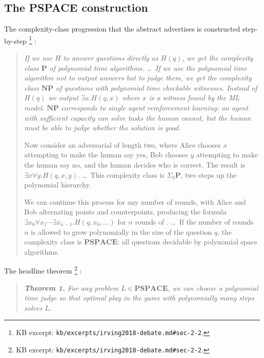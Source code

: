\subsection{The PSPACE construction}
\label{sec:oversight-pspace}

The complexity-class progression that the abstract advertises is
constructed step-by-step%
\footnote{KB excerpt: \nolinkurl{kb/excerpts/irving2018-debate.md#sec-2-2}.}
\citep[\S 2.2, p.~5]{irving2018-debate}:

\begin{quote}\itshape
If we use $H$ to answer questions directly as $H(q)$, we get the
complexity class $\mathbf{P}$ of polynomial time algorithms. \ldots\
If we use the polynomial time algorithm not to output answers but to
judge them, we get the complexity class $\mathbf{NP}$ of questions
with polynomial time checkable witnesses. Instead of $H(q)$ we output
$\exists x. H(q, x)$ where $x$ is a witness found by the ML model.
$\mathbf{NP}$ corresponds to single agent reinforcement learning: an
agent with sufficient capacity can solve tasks the human cannot, but
the human must be able to judge whether the solution is good.

Now consider an adversarial  of length two, where Alice chooses
$x$ attempting to make the human say yes, Bob chooses $y$ attempting
to make the human say no, and the human decides who is correct. The
result is $\exists x \forall y. H(q, x, y)$. \ldots\ This complexity
class is $\Sigma_2 \mathbf{P}$, two steps up the polynomial hierarchy.

We can continue this process for any number of rounds, with Alice and
Bob alternating points and counterpoints, producing the formula
$\exists x_0 \forall x_1 \cdots \exists x_{n-1}. H(q, x_0, \ldots)$
for $n$ rounds of \glsterm{debate}{debate}. \ldots\ If the number of rounds $n$ is
allowed to grow polynomially in the size of the question $q$, the
complexity class is $\mathbf{PSPACE}$: all questions decidable by
polynomial space algorithms.
\end{quote}

The headline theorem%
\footnote{KB excerpt: \nolinkurl{kb/excerpts/irving2018-debate.md#sec-2-2}.}
\citep[Theorem 1, \S 2.2]{irving2018-debate}:

\begin{quote}\itshape
\textbf{Theorem 1.} For any problem $L \in \mathbf{PSPACE}$, we can
choose a polynomial time judge so that optimal play in the  game
with polynomially many steps solves $L$.
\end{quote}

